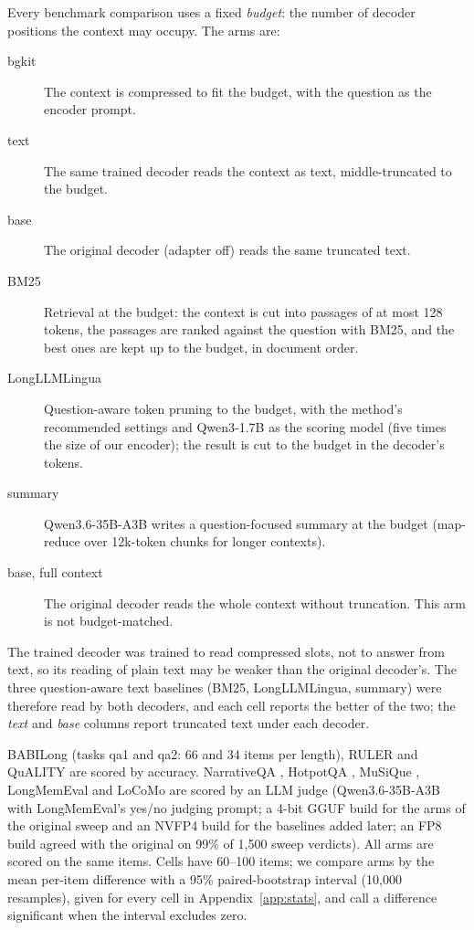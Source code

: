 \documentclass[11pt]{article}
\begin{document}
Every benchmark comparison uses a fixed \emph{budget}: the number of decoder positions the context may
occupy. The arms are:
\begin{description}
\item[bgkit] The context is compressed to fit the budget, with the question as the encoder prompt.
\item[text] The same trained decoder reads the context as text, middle-truncated to the budget.
\item[base] The original decoder (adapter off) reads the same truncated text.
\item[BM25] Retrieval at the budget: the context is cut into passages of at most 128 tokens, the
  passages are ranked against the question with BM25, and the best ones are kept up to the budget,
  in document order.
\item[LongLLMLingua] Question-aware token pruning \citep{jiang2024longllmlingua} to the budget, with
  the method's recommended settings and Qwen3-1.7B as the scoring model (five times the size of our
  encoder); the result is cut to the budget in the decoder's tokens.
\item[summary] Qwen3.6-35B-A3B writes a question-focused summary at the budget (map-reduce over
  12k-token chunks for longer contexts).
\item[base, full context] The original decoder reads the whole context without truncation. This arm
  is not budget-matched.
\end{description}
The trained decoder was trained to read compressed slots, not to answer from text, so its reading of
plain text may be weaker than the original decoder's. The three question-aware text baselines (BM25,
LongLLMLingua, summary) were therefore read by both decoders, and each cell reports the better of
the two; the \emph{text} and \emph{base} columns report truncated text under each decoder.

BABILong \citep{kuratov2024babilong} (tasks qa1 and qa2: 66 and 34 items per length), RULER \citep{hsieh2024ruler} and QuALITY
\citep{pang2022quality} are scored by accuracy. NarrativeQA \citep{kocisky2018narrativeqa}, HotpotQA
\citep{yang2018hotpotqa}, MuSiQue \citep{trivedi2022musique}, LongMemEval \citep{wu2025longmemeval}
and LoCoMo \citep{maharana2024locomo} are scored by an LLM judge (Qwen3.6-35B-A3B with
LongMemEval's yes/no judging prompt; a 4-bit GGUF build for the arms of the original sweep and an NVFP4
build for the baselines added later; an FP8 build agreed with the original on 99\% of 1{,}500 sweep
verdicts). All arms are scored on the same items. Cells have 60--100 items;
we compare arms by the mean per-item difference with a 95\% paired-bootstrap interval (10{,}000
resamples), given for every cell in Appendix~\ref{app:stats}, and call a difference significant when
the interval excludes zero.
\end{document}
